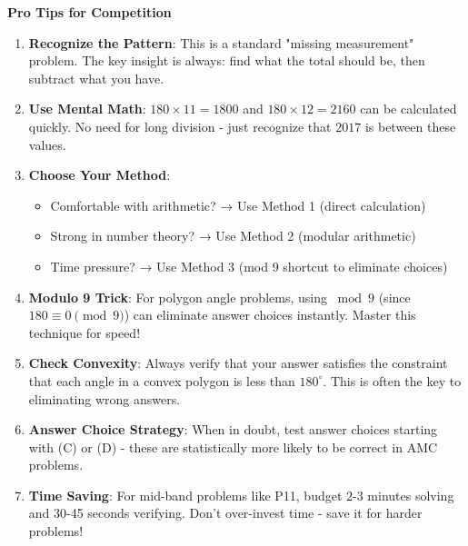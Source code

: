 \documentclass[]{article}
\begin{document}
\begin{tipbox}
\textbf{Pro Tips for Competition}

\begin{enumerate}[leftmargin=*]
    \item \textbf{Recognize the Pattern}: This is a standard "missing measurement" problem. The key insight is always: find what the total should be, then subtract what you have.
    
    \item \textbf{Use Mental Math}: $180 \times 11 = 1800$ and $180 \times 12 = 2160$ can be calculated quickly. No need for long division - just recognize that $2017$ is between these values.
    
    \item \textbf{Choose Your Method}: 
    \begin{itemize}
        \item Comfortable with arithmetic? → Use Method 1 (direct calculation)
        \item Strong in number theory? → Use Method 2 (modular arithmetic)
        \item Time pressure? → Use Method 3 (mod 9 shortcut to eliminate choices)
    \end{itemize}
    
    \item \textbf{Modulo 9 Trick}: For polygon angle problems, using $\bmod 9$ (since $180 \equiv 0 \pmod{9}$) can eliminate answer choices instantly. Master this technique for speed!
    
    \item \textbf{Check Convexity}: Always verify that your answer satisfies the constraint that each angle in a convex polygon is less than $180^\circ$. This is often the key to eliminating wrong answers.
    
    \item \textbf{Answer Choice Strategy}: When in doubt, test answer choices starting with (C) or (D) - these are statistically more likely to be correct in AMC problems.
    
    \item \textbf{Time Saving}: For mid-band problems like P11, budget 2-3 minutes solving and 30-45 seconds verifying. Don't over-invest time - save it for harder problems!
\end{enumerate}
\end{tipbox}
\end{document}
